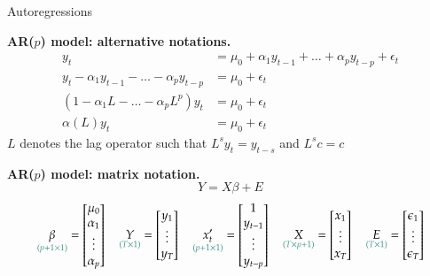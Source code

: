 \documentclass[notes,blackandwhite,mathsans]{beamer}
\begin{document}
\begin{frame}{Autoregressions}

\textbf{AR($p$) model: alternative notations.}
\begin{align*}
y_t &= \mu_0 + \alpha_1y_{t-1} + \dots + \alpha_p y_{t-p} + \epsilon_t  \\
y_t - \alpha_1y_{t-1} - \dots - \alpha_p y_{t-p} &= \mu_0  + \epsilon_t  \\
\left( 1- \alpha_1L - \dots -\alpha_pL^p \right)y_t &= \mu_0 + \epsilon_t\\
\alpha(L) y_t &= \mu_0 + \epsilon_t
\end{align*}
$L$ {\color{mcxs2}denotes the lag operator such that} $L^sy_t=y_{t-s}$ {\color{mcxs2}and} $L^sc=c$

\bigskip\textbf{AR($p$) model: matrix notation.}
$$Y = X \beta + E  $$\footnotesize
$$ \underset{\color{mcxs2}(p+1\times1)}{\beta} = \begin{bmatrix} \mu_0\\ \alpha_1\\ \vdots \\ \alpha_p \end{bmatrix} \quad \underset{\color{mcxs2}(T\times1)}{Y} = \begin{bmatrix} y_1\\ \vdots \\ y_T \end{bmatrix} \quad \underset{\color{mcxs2}(p+1\times1)}{x_t'} = \begin{bmatrix} 1\\ y_{t-1}\\ \vdots \\ y_{t-p} \end{bmatrix} \quad \underset{\color{mcxs2}(T\times p+1)}{X} = \begin{bmatrix} x_1\\ \vdots \\ x_T \end{bmatrix}\quad \underset{\color{mcxs2}(T\times1)}{E} = \begin{bmatrix} \epsilon_1\\ \vdots \\ \epsilon_T \end{bmatrix}$$

\end{frame}
\end{document}
